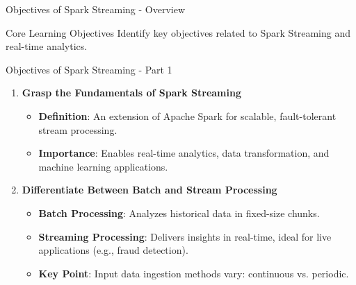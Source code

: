 \documentclass[aspectratio=169]{beamer}
\begin{document}
\begin{frame}[fragile]{Objectives of Spark Streaming - Overview}
    \begin{block}{Core Learning Objectives}
        Identify key objectives related to Spark Streaming and real-time analytics.
    \end{block}
\end{frame}

\begin{frame}[fragile]{Objectives of Spark Streaming - Part 1}
    \begin{enumerate}
        \item \textbf{Grasp the Fundamentals of Spark Streaming}
        \begin{itemize}
            \item \textbf{Definition}: An extension of Apache Spark for scalable, fault-tolerant stream processing.
            \item \textbf{Importance}: Enables real-time analytics, data transformation, and machine learning applications.
        \end{itemize}
        
        \item \textbf{Differentiate Between Batch and Stream Processing}
        \begin{itemize}
            \item \textbf{Batch Processing}: Analyzes historical data in fixed-size chunks.
            \item \textbf{Streaming Processing}: Delivers insights in real-time, ideal for live applications (e.g., fraud detection).
            \item \textbf{Key Point}: Input data ingestion methods vary: continuous vs. periodic.
        \end{itemize}
    \end{enumerate}
\end{frame}
\end{document}
